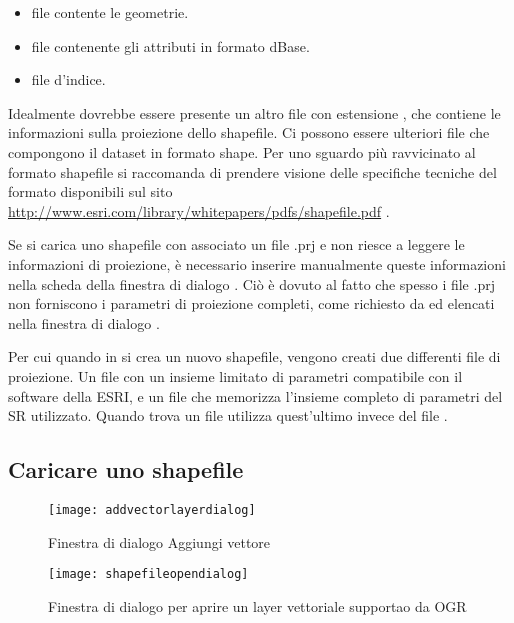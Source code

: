 \begin{itemize}
\item {} file contente le geometrie.
\item {} file contenente gli attributi in formato dBase.
\item {} file d'indice.
\end{itemize}

Idealmente dovrebbe essere presente un altro file con estensione
, che contiene le informazioni sulla proiezione dello
shapefile. Ci possono essere ulteriori file che compongono il dataset in
formato shape. Per uno sguardo più ravvicinato al formato shapefile si
raccomanda di prendere visione delle specifiche tecniche del formato
disponibili sul sito \url{http://www.esri.com/library/whitepapers/pdfs/shapefile.pdf}
.


Se si carica uno shapefile con associato un file .prj e \qg non riesce a leggere 
le informazioni di proiezione, è necessario inserire manualmente queste informazioni 
nella scheda  della finestra di dialogo . 
Ciò è dovuto al fatto che spesso i file .prj non forniscono i parametri di proiezione 
completi, come richiesto da \qg ed elencati nella finestra di dialogo .

Per cui quando in \qg si crea un nuovo shapefile, vengono creati due differenti file di 
proiezione. Un file  con un insieme limitato di parametri compatibile 
con il software della ESRI, e un file  che memorizza l'insieme completo 
di parametri del SR utilizzato. Quando \qg trova un file  utilizza quest'ultimo 
invece del file .

\subsection{Caricare uno shapefile}\label{sec:load_shapefile}

\begin{figure}[ht]
   \centering
   \texttt{[image: addvectorlayerdialog]}
   \caption{Finestra di dialogo Aggiungi vettore \nixcaption}\label{fig:addvectorlayer}
\end{figure}

\begin{figure}[ht]
   \centering
   \texttt{[image: shapefileopendialog]}
   \caption{Finestra di dialogo per aprire un layer vettoriale supportao da OGR \nixcaption}\label{fig:openshapefile}
\end{figure}

